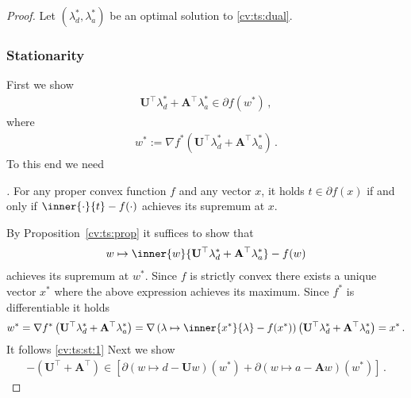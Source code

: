 \begin{proof}
  Let 
$
(\lambda_d^*,\lambda_a^*)
$
be an optimal solution to
\eqref{cv:ts:dual}.
  \subsubsection*{Stationarity}
  First we show
\begin{gather}
  \label{cv:ts:st:1}
      \mathbf{U}^\top  \lambda_d^*
      +
      \mathbf{A}^\top  \lambda_a^*
      \in
\partial f (w^*)
\,,
\end{gather}
where
\begin{gather*}
  w^*
  :=
  \nabla
    f^*
    \left( 
      \mathbf{U}^\top  \lambda_d^*
      +
      \mathbf{A}^\top  \lambda_a^*
    \right)
    \,.
\end{gather*}
To this end we need
\begin{proposition}
  \label{cv:ts:prop}
  \emph{
\cite[Theorem~23.5(a)-(b)]{Rockafellar1970}.
  }
   For any proper convex function $f$ and any vector $x$, 
   it holds $t\in \partial f(x)$ 
   if and only if 
   $
   \inner
   {\cdot}{t}
   -
   f(\cdot)
   $
   achieves its supremum at $x$.
\end{proposition}
By Proposition~\ref{cv:ts:prop}
it suffices to show
that
$
$
\begin{gather}
  w
  \mapsto
\inner
{w}
{
      \mathbf{U}^\top  \lambda_d^*
      +
      \mathbf{A}^\top  \lambda_a^*
}
-
f(w)
\end{gather}
achieves its supremum at
$w^*$.
Since $f$ is strictly convex 
there exists a unique vector $x^*$
where
the above expression achieves its maximum.
Since
$f^*$ is differentiable it holds
\begin{gather*}
  w^*
  =
  \nabla
    f^*
    \left( 
      \mathbf{U}^\top  \lambda_d^*
      +
      \mathbf{A}^\top  \lambda_a^*
    \right)
    =
    \nabla
    \left( 
      \lambda
      \mapsto
\inner
{x^*}
{
  \lambda
}
-
f(x^*)
    \right)
    \left( 
      \mathbf{U}^\top  \lambda_d^*
      +
      \mathbf{A}^\top  \lambda_a^*
    \right)
    =
x^*
\,.
\end{gather*}
It follows 
\eqref{cv:ts:st:1}
Next we show
\begin{gather}
  -
  \left( 
      \mathbf{U}^\top  
      +
      \mathbf{A}^\top  
  \right)
  \in
  \left[ 
    \partial
    \left( 
      w
      \mapsto
      d
      -
      \mathbf{U}w
    \right)
    (w^*)
    +
    \partial
    \left( 
      w
      \mapsto
      a
      -
      \mathbf{A}w
    \right)
    (w^*)
  \right]
  \,.
\end{gather}


\end{proof}
